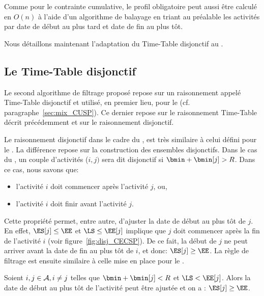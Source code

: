 Comme pour le contrainte cumulative, le profil obligatoire peut aussi
être calculé en $O(n)$ à l'aide d'un algorithme de balayage en triant
au préalable les activités par date de début au plus tard et date de
fin au plus tôt.

Nous détaillons maintenant l'adaptation du Time-Table disjonctif au
\CECSP. 

\subsection{Le Time-Table disjonctif}

Le second algorithme de filtrage proposé repose sur un raisonnement
appelé Time-Table disjonctif et utilisé, en premier lieu, pour le
\CUSP (cf. paragraphe~\ref{sec:mix_CUSP}). Ce dernier repose sur le
raisonnement Time-Table décrit précédemment et sur le raisonnement
disjonctif.

Le raisonnement disjonctif dans le cadre du \CECSP, est très similaire
à celui défini pour le \CUSP. La différence repose sur la construction
des ensembles disjonctifs. Dans le cas du \CECSP, un couple
d'activités ($i,j)$ sera dit disjonctif si $\bmin+\bmin[j] >R$. Dans
ce cas, nous savons que:
\begin{itemize}
\item l'activité $i$ doit commencer après l'activité $j$, ou, 
\item l'activité $i$ doit finir avant l'activité $j$.  
\end{itemize}

Cette propriété permet, entre autre, d'ajuster la date de début au
plus tôt de $j$. En effet, $\ES[j] \le \EE$ et $\LS \le \EE[j]$
implique que $j$ doit commencer après la fin de l'activité $i$ (voir
figure~\ref{fig:disj_CECSP}). De ce fait, la début de $j$ ne peut arriver
avant la date de fin au plus tôt de $i$, et donc: $\ES[j] \ge \EE$. La
règle de filtrage est ensuite similaire à celle mise en place pour le
\CUSP. 

\begin{reg}
Soient $i, j \in {\cal A}, i \neq j$ telles que $\bmin+\bmin[j] < R$ et $\LS
< \EE[j]$. Alors la date de début au plus tôt de l’activité peut être
ajustée et on a : $\ES[j] \ge \EE$.
\end{reg}

